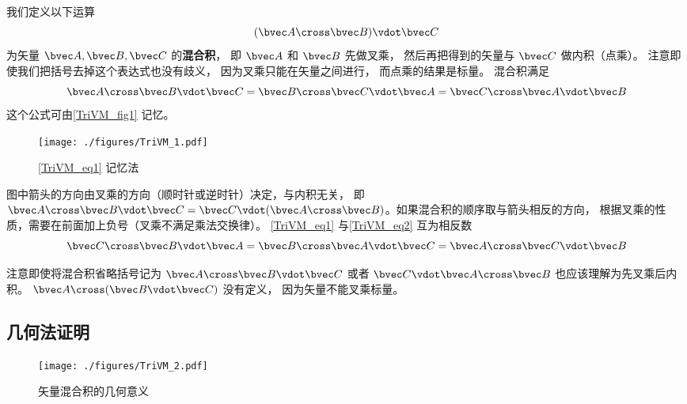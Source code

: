
我们定义以下运算
\begin{equation}
(\bvec A \cross \bvec B) \vdot \bvec C
\end{equation}
为矢量 $\bvec A, \bvec B, \bvec C$ 的\textbf{混合积}， 即 $\bvec A$ 和 $\bvec B$ 先做叉乘， 然后再把得到的矢量与 $\bvec C$ 做内积（点乘）。 注意即使我们把括号去掉这个表达式也没有歧义， 因为叉乘只能在矢量之间进行， 而点乘的结果是标量。 混合积满足
\begin{equation}\label{TriVM_eq1}
\bvec A \cross \bvec B \vdot \bvec C = \bvec B \cross \bvec C \vdot \bvec A = \bvec C \cross \bvec A \vdot \bvec B
\end{equation} 
这个公式可由\autoref{TriVM_fig1} 记忆。
\begin{figure}[ht]
\centering %
\texttt{[image: ./figures/TriVM\_1.pdf]}
\caption{\autoref{TriVM_eq1} 记忆法}\label{TriVM_fig1}
\end{figure}
图中箭头的方向由叉乘的方向（顺时针或逆时针）决定，与内积无关， 即 $\bvec A\cross \bvec B \vdot \bvec C = \bvec C \vdot (\bvec A \cross \bvec B)$。如果混合积的顺序取与箭头相反的方向， 根据叉乘的性质，需要在前面加上负号（叉乘不满足乘法交换律）。 \autoref{TriVM_eq1} 与\autoref{TriVM_eq2} 互为相反数
\begin{equation}\label{TriVM_eq2}
\bvec C \cross \bvec B \vdot \bvec A = \bvec B \cross \bvec A \vdot \bvec C = \bvec A \cross \bvec C \vdot \bvec B
\end{equation}

注意即使将混合积省略括号记为 $\bvec A \cross \bvec B \vdot \bvec C$ 或者 $\bvec C \vdot \bvec A \cross \bvec B$ 也应该理解为先叉乘后内积。 $\bvec A \cross (\bvec B \vdot \bvec C)$ 没有定义， 因为矢量不能叉乘标量。

\subsection{几何法证明}

\begin{figure}[ht]
\centering
\texttt{[image: ./figures/TriVM\_2.pdf]}
\caption{矢量混合积的几何意义} \label{TriVM_fig2}
\end{figure}

